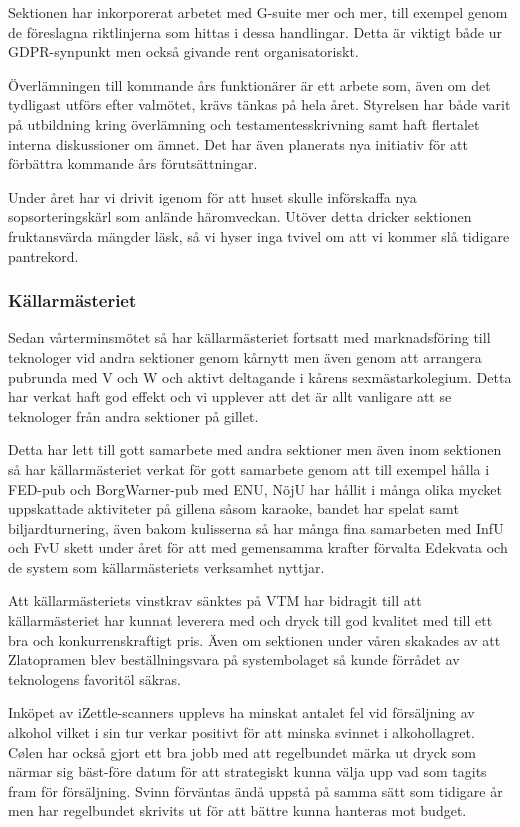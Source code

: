 \documentclass[../_main/handlingar.tex]{subfiles}
\begin{document}
Sektionen har inkorporerat arbetet med G-suite mer och mer, till exempel genom de föreslagna riktlinjerna som hittas i dessa handlingar. Detta är viktigt både ur GDPR-synpunkt men också givande rent organisatoriskt. 

Överlämningen till kommande års funktionärer är ett arbete som, även om det tydligast utförs efter valmötet, krävs tänkas på hela året. Styrelsen har både varit på utbildning kring överlämning och testamentesskrivning samt haft flertalet interna diskussioner om ämnet. Det har även planerats nya initiativ för att förbättra kommande års förutsättningar. 

Under året har vi drivit igenom för att huset skulle införskaffa nya sopsorteringskärl som anlände häromveckan. Utöver detta dricker sektionen fruktansvärda mängder läsk, så vi hyser inga tvivel om att vi kommer slå tidigare pantrekord.  


\subsubsection*{Källarmästeriet}

Sedan vårterminsmötet så har källarmästeriet fortsatt med marknadsföring till teknologer vid andra sektioner genom kårnytt men även genom att arrangera pubrunda med V och W och aktivt deltagande i kårens sexmästarkolegium. Detta har verkat haft god effekt och vi upplever att det är allt vanligare att se teknologer från andra sektioner på gillet. 

Detta har lett till gott samarbete med andra sektioner men även inom sektionen så har källarmästeriet verkat för gott samarbete genom att till exempel hålla i FED-pub och BorgWarner-pub med ENU, NöjU har hållit i många olika mycket uppskattade aktiviteter på gillena såsom karaoke, bandet har spelat samt biljardturnering, även bakom kulisserna så har många fina samarbeten med InfU och FvU skett under året för att med gemensamma krafter förvalta Edekvata och de system som källarmästeriets verksamhet nyttjar. 

Att källarmästeriets vinstkrav sänktes på VTM har bidragit till att källarmästeriet har kunnat leverera med och dryck till god kvalitet med till ett bra och konkurrenskraftigt pris. Även om sektionen under våren skakades av att Zlatopramen blev beställningsvara på systembolaget så kunde förrådet av teknologens favoritöl säkras. 

Inköpet av iZettle-scanners upplevs ha minskat antalet fel vid försäljning av alkohol vilket i sin tur verkar positivt för att minska svinnet i alkohollagret. Cølen har också gjort ett bra jobb med att regelbundet märka ut dryck som närmar sig bäst-före datum för att strategiskt kunna välja upp vad som tagits fram för försäljning. Svinn förväntas ändå uppstå på samma sätt som tidigare år men har regelbundet skrivits ut för att bättre kunna hanteras mot budget. 
\end{document}
